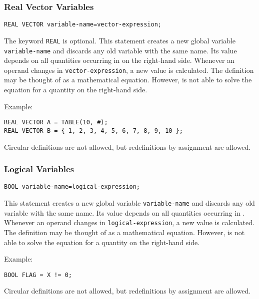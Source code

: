 \subsubsection{Real Vector Variables}
\begin{verbatim}
REAL VECTOR variable-name=vector-expression;
\end{verbatim}
The keyword \texttt{REAL} is optional.
This statement creates a new global variable \texttt{variable-name}
and discards any old variable with the same name.
Its value depends on all quantities occurring
in  on the right-hand side.
Whenever an operand changes in \texttt{vector-expression},
a new value is calculated.
The definition may be thought of as a mathematical equation.
However, \opal is not able to solve the equation for a quantity on the
right-hand side.

\noindent Example:
\begin{verbatim}
REAL VECTOR A = TABLE(10, #);
REAL VECTOR B = { 1, 2, 3, 4, 5, 6, 7, 8, 9, 10 };
\end{verbatim}
Circular definitions are not allowed, but redefinitions by assignment 
are allowed.

\subsubsection{Logical Variables}
\begin{verbatim}
BOOL variable-name=logical-expression;
\end{verbatim}
This statement creates a new global variable \texttt{variable-name}
and discards any old variable with the same name.
Its value depends on all quantities occurring
in .
Whenever an operand changes in \texttt{logical-expression},
a new value is calculated.
The definition may be thought of as a mathematical equation.
However, \opal is not able to solve the equation for a quantity on the
right-hand side.

\noindent Example:
\begin{verbatim}
BOOL FLAG = X != 0;
\end{verbatim}
Circular definitions are not allowed, but redefinitions by assignment 
are allowed.

